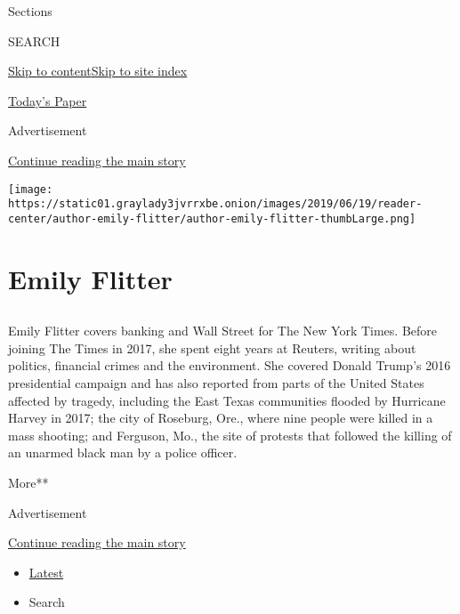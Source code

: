 Sections

SEARCH

\protect\hyperlink{site-content}{Skip to
content}\protect\hyperlink{site-index}{Skip to site index}

\href{https://myaccount.nytimes3xbfgragh.onion/auth/login?response_type=cookie\&client_id=vi}{}

\href{https://www.nytimes3xbfgragh.onion/section/todayspaper}{Today's
Paper}

Advertisement

\protect\hyperlink{after-top}{Continue reading the main story}

\texttt{[image: https://static01.graylady3jvrrxbe.onion/images/2019/06/19/reader-center/author-emily-flitter/author-emily-flitter-thumbLarge.png]}

\hypertarget{emily-flitter}{%
\section{Emily Flitter}\label{emily-flitter}}

\subsection{}

Emily Flitter covers banking and Wall Street for The New York Times.
Before joining The Times in 2017, she spent eight years at Reuters,
writing about politics, financial crimes and the environment. She
covered Donald Trump's 2016 presidential campaign and has also reported
from parts of the United States affected by tragedy, including the East
Texas communities flooded by Hurricane Harvey in 2017; the city of
Roseburg, Ore., where nine people were killed in a mass shooting; and
Ferguson, Mo., the site of protests that followed the killing of an
unarmed black man by a police officer.

More**

Advertisement

\protect\hyperlink{after-mid1}{Continue reading the main story}

\begin{itemize}
\tightlist
\item
  \protect\hyperlink{stream-panel}{Latest}
\item
  Search
\end{itemize}


